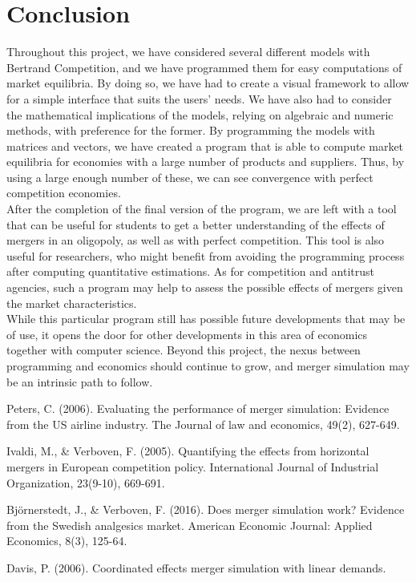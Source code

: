 \documentclass[12pt]{article}
\begin{document}
\section{Conclusion}
Throughout this project, we have considered several different models with Bertrand Competition, and we have programmed them for easy computations of market equilibria. By doing so, we have had to create a visual framework to allow for a simple interface that suits the users' needs. We have also had to consider the mathematical implications of the models, relying on algebraic and numeric methods, with preference for the former. By programming the models with matrices and vectors, we have created a program that is able to compute market equilibria for economies with a large number of products and suppliers. Thus, by using a large enough number of these, we can see convergence with perfect competition economies. \\
After the completion of the final version of the program, we are left with a tool that can be useful for students to get a better understanding of the effects of mergers in an oligopoly, as well as with perfect competition. This tool is also useful for researchers, who might benefit from avoiding the programming process after computing quantitative estimations. As for competition and antitrust agencies, such a program may help to assess the possible effects of mergers given the market characteristics.\\
While this particular program still has possible future developments that may be of use, it opens the door for other developments in this area of economics together with computer science. Beyond this project, the nexus between programming and economics should continue to grow, and merger simulation may be an intrinsic path to follow. 

\newpage
\begin{thebibliography}{9}

Peters, C. (2006). Evaluating the performance of merger simulation: Evidence from the US airline industry. The Journal of law and economics, 49(2), 627-649.

Ivaldi, M., \& Verboven, F. (2005). Quantifying the effects from horizontal mergers in European competition policy. International Journal of Industrial Organization, 23(9-10), 669-691.

Bj\"{o}rnerstedt, J., \& Verboven, F. (2016). Does merger simulation work? Evidence from the Swedish analgesics market. American Economic Journal: Applied Economics, 8(3), 125-64.

Davis, P. (2006). Coordinated effects merger simulation with linear demands.
\end{thebibliography}
\end{document}
